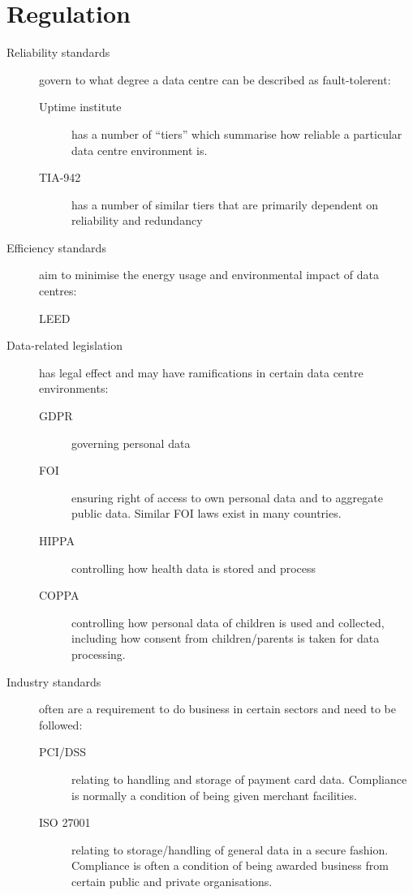 \section{Regulation}
\label{sec:regulation}

\begin{description}
\item[Reliability standards] govern to what degree a data centre can be described as fault-tolerent:
  \begin{description}
  \item[Uptime institute] has a number of ``tiers'' which summarise how reliable a particular data centre environment is.
  \item[TIA-942] has a number of similar tiers that are primarily dependent on reliability and redundancy
  \end{description}
\item[Efficiency standards] aim to minimise the energy usage and environmental impact of data centres:
\begin{description}
\item[LEED]
\end{description}
\item[Data-related legislation] has legal effect and may have ramifications in certain data centre environments:
  \begin{description}
  \item[GDPR] governing personal data
  \item[FOI] ensuring right of access to own personal data and to aggregate public data. Similar FOI laws exist in many countries.
  \item[HIPPA] controlling how health data is stored and process
  \item[COPPA] controlling how personal data of children is used and collected, including how consent from children/parents is taken for data processing.
  \end{description}
\item[Industry standards] often are a requirement to do business in certain sectors and need to be followed:
  \begin{description}
  \item[PCI/DSS] relating to handling and storage of payment card data. Compliance is normally a condition of being given merchant facilities.
  \item[ISO 27001] relating to storage/handling of general data in a secure fashion.  Compliance is often a condition of being awarded business from certain public and private organisations.
  \end{description}
\end{description}


